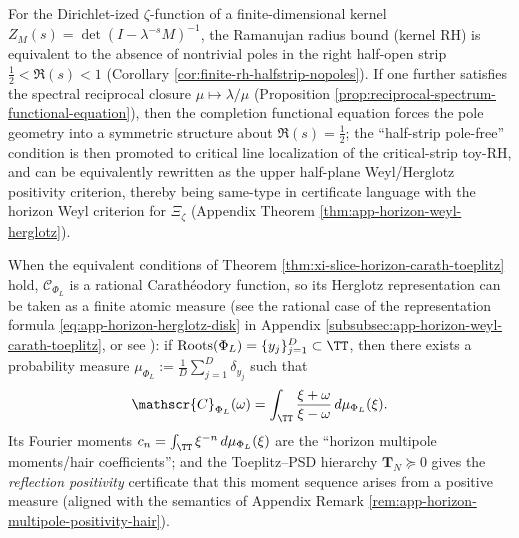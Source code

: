 \begin{remark}\label{rem:xi-finite-kernel-ramanujan-herglotz-interface}
For the Dirichlet-ized \(\zeta\)-function of a finite-dimensional kernel \(Z_M(s)=\det(I-\lambda^{-s}M)^{-1}\), the Ramanujan radius bound (kernel RH) is equivalent to the absence of nontrivial poles in the right half-open strip \(\tfrac12<\Re(s)<1\) (Corollary \ref{cor:finite-rh-halfstrip-nopoles}).
If one further satisfies the spectral reciprocal closure \(\mu\mapsto \lambda/\mu\) (Proposition \ref{prop:reciprocal-spectrum-functional-equation}), then the completion functional equation forces the pole geometry into a symmetric structure about \(\Re(s)=\tfrac12\);
the ``half-strip pole-free'' condition is then promoted to critical line localization of the critical-strip toy-RH, and can be equivalently rewritten as the upper half-plane Weyl/Herglotz positivity criterion, thereby being same-type in certificate language with the horizon Weyl criterion for \(\Xi_\zeta\) (Appendix Theorem \ref{thm:app-horizon-weyl-herglotz}).
\end{remark}

\begin{remark}\label{rem:xi-slice-horizon-measure-reflection-positivity}
When the equivalent conditions of Theorem \ref{thm:xi-slice-horizon-carath-toeplitz} hold,
\(\mathscr{C}_{\Phi_L}\) is a rational Carath\'eodory function, so its Herglotz representation can be taken as a finite atomic measure (see the rational case of the representation formula \eqref{eq:app-horizon-herglotz-disk} in Appendix \ref{subsubsec:app-horizon-weyl-carath-toeplitz}, or see \cite{Simon2005OPUC1}):
if \(\mathrm{Roots}(\Phi_L)=\{y_j\}_{j=1}^{D}\subset\TT\), then there exists a probability measure
\(
\mu_{\Phi_L}:=\frac{1}{D}\sum_{j=1}^{D}\delta_{y_j}
\)
such that
\[
\mathscr{C}_{\Phi_L}(\omega)=\int_{\TT}\frac{\xi+\omega}{\xi-\omega}\,d\mu_{\Phi_L}(\xi).
\]
Its Fourier moments \(c_n=\int_{\TT}\xi^{-n}\,d\mu_{\Phi_L}(\xi)\) are the ``horizon multipole moments/hair coefficients'';
and the Toeplitz--PSD hierarchy \(\mathbf{T}_N\succeq 0\) gives the \emph{reflection positivity} certificate that this moment sequence arises from a positive measure (aligned with the semantics of Appendix Remark \ref{rem:app-horizon-multipole-positivity-hair}).
\end{remark}


